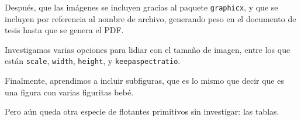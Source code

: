 Después, que las imágenes se incluyen gracias al paquete \texttt{graphicx}, y que se incluyen por referencia al nombre de archivo, generando peso en el documento de tesis hasta que se genera el PDF.

Investigamos varias opciones para lidiar con el tamaño de imagen, entre los que están \texttt{scale}, \texttt{width}, \texttt{height}, y \texttt{keepaspectratio}.

Finalmente, aprendimos a incluir subfiguras, que es lo mismo que decir que es una figura con varias figuritas bebé.

Pero aún queda otra especie de flotantes primitivos sin investigar: las tablas.